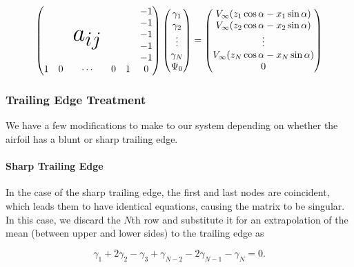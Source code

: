\documentclass[]{article}
\begin{document}
 \begin{equation}
	\begin{pmatrix}
		& & & & & -1 \\
		& & \multirow{3}{*}{\Huge $a_{ij}$}  & & & -1 \\
		& & & & & -1 \\
		& & & & & -1 \\
		& & & & & -1 \\
		1 & 0 & \cdots & 0 & 1 & 0
	\end{pmatrix}
%
	\begin{pmatrix}
		\gamma_1 \\
		\gamma_2 \\
		\vdots \\
		\gamma_N \\
		\Psi_0 \\
	\end{pmatrix}
=
	\begin{pmatrix}
		V_\infty(z_1\cos\alpha - x_1 \sin\alpha) \\
		V_\infty(z_2\cos\alpha - x_2 \sin\alpha) \\
		\vdots \\
		V_\infty(z_N\cos\alpha - x_N \sin\alpha) \\
		0
	\end{pmatrix}
\end{equation}


\subsubsection{Trailing Edge Treatment}

We have a few modifications to make to our system depending on whether the airfoil has a blunt or sharp trailing edge.

\paragraph{Sharp Trailing Edge}

In the case of the sharp trailing edge, the first and last nodes are coincident, which leads them to have identical equations, causing the matrix to be singular.  In this case, we discard the \(N\)th row and substitute it for an extrapolation of the mean (between upper and lower sides) to the trailing edge as

\begin{equation}
	\gamma_1 + 2\gamma_2 - \gamma_3 + \gamma_{N-2} - 2\gamma_{N-1} - \gamma_N = 0.
\end{equation}
\end{document}

